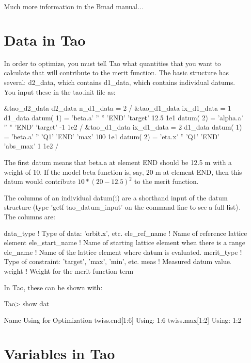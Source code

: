 \documentclass{hitec}
\newcommand{\Section}[1]{\section{#1}\vspace*{-1ex}}
\begin{document}
Much more information in the Bmad manual...


\Section{Data in Tao}

In order to optimize, you must tell Tao what quantities that you want to calculate that will contribute to the merit function. The basic structure has several: d2_data, which contains d1_data, which contains individual datums. You input these in the tao.init file as:
\begin{code}
&tao_d2_data
    d2_data%
    n_d1_data = 2
/
&tao_d1_data
    ix_d1_data = 1
    d1_data%
    datum( 1) =  'beta.a'     '' '' 'END'   'target'  12.5   1e1  
    datum( 2) =  'alpha.a'    '' '' 'END'   'target'  -1     1e2
/ 
&tao_d1_data
    ix_d1_data = 2
    d1_data%
    datum( 1) =  'beta.a'    '' 'Q1' 'END'   'max'  100   1e1
    datum( 2) =  'eta.x'     '' 'Q1' 'END'   'abs_max'  1     1e2
/ 
\end{code}

The first datum means that beta.a at element END should be 12.5 m with a weight of 10. If the model beta function is, say, 20 m at element END, then this datum would contribute $10*(20 - 12.5)^2$ to the merit function. 

The columns of an individual datum(i) are a shorthand input of the datum structure (type 'getf tao_datum_input' on the command line to see a full list). The columns are:
\begin{code}
data_type       ! Type of data: 'orbit.x', etc.
ele_ref_name    ! Name of reference lattice element
ele_start_name  ! Name of starting lattice element when there is a range
ele_name        ! Name of the lattice element where datum is evaluated.
merit_type      ! Type of constraint: 'target', 'max', 'min', etc.
meas            ! Measured datum value.
weight          ! Weight for the merit function term
\end{code}

In Tao, these can be shown with:
\begin{code}
Tao> show dat

  Name                                 Using for Optimization
  twiss.end[1:6]                                 Using: 1:6
  twiss.max[1:2]                                 Using: 1:2
\end{code}


\Section{Variables in Tao}
\end{document}
